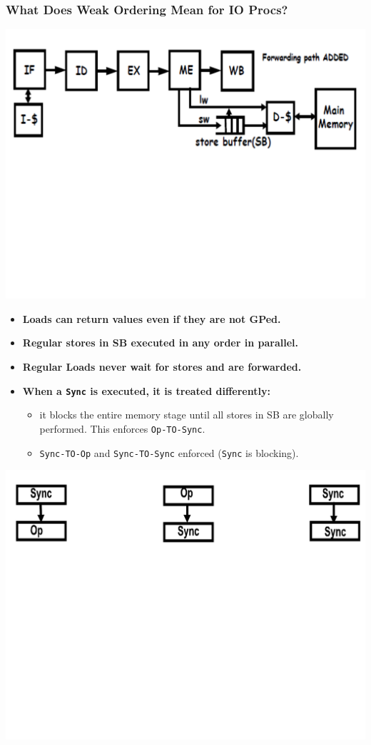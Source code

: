 \documentclass{beamer}
\renewcommand{\emph}[1]{\textcolor{structure}{#1}}
\newcommand{\emp}[1]{\textcolor{DikuRed}{ #1}}
\begin{document}
\begin{frame}[fragile,t]
\frametitle{What Does Weak Ordering Mean for IO Procs?}
\vspace{-3ex}
\includegraphics[width=55ex]{Ch7Figs/WeakOrdPipeline}
\vspace{-23ex}

\begin{itemize}
    \item \emph{\bf Loads can return values even if they are not GPed.}\smallskip

    \item \emph{\bf Regular stores in SB executed in any order in parallel.}\smallskip

    \item \emph{\bf Regular Loads never wait for stores and are forwarded.}

    \item \emp{\bf When a {\tt Sync} is executed, it is treated differently:}
        \begin{itemize}
            \item it blocks the entire memory stage until all stores in SB
                    are globally performed. This enforces \emp{\tt Op-TO-Sync}.
            \item \emp{\tt Sync-TO-Op} and \emp{\tt Sync-TO-Sync} 
                    enforced ({\tt Sync} is blocking). %
        \end  {itemize}
\end{itemize}

\includegraphics[width=55ex]{Ch7Figs/WeakOrdering}

\end{frame}
\end{document}
